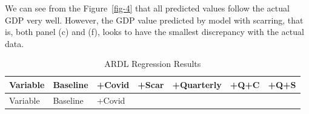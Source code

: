 \documentclass[
  manuscript=article,
  layout=publish,
  year=2026,
  volume=3,
]{den}
\begin{document}
We can see from the Figure~\ref{fig-4} that all predicted values follow
the actual GDP very well. However, the GDP value predicted by model with
scarring, that is, both panel (c) and (f), looks to have the smallest
discrepancy with the actual data.

\begin{longtable}[]{@{}
  >{\raggedright\arraybackslash}p{}
  >{\raggedright\arraybackslash}p{}
  >{\raggedright\arraybackslash}p{}
  >{\raggedright\arraybackslash}p{}
  >{\raggedright\arraybackslash}p{}
  >{\raggedright\arraybackslash}p{}
  >{\raggedright\arraybackslash}p{}@{}}
\caption{ARDL Regression Results}\label{tbl-ardl}\tabularnewline
\toprule\noalign{}
\begin{minipage}[b]{\linewidth}\raggedright
Variable
\end{minipage} & \begin{minipage}[b]{\linewidth}\raggedright
Baseline
\end{minipage} & \begin{minipage}[b]{\linewidth}\raggedright
+Covid
\end{minipage} & \begin{minipage}[b]{\linewidth}\raggedright
+Scar
\end{minipage} & \begin{minipage}[b]{\linewidth}\raggedright
+Quarterly
\end{minipage} & \begin{minipage}[b]{\linewidth}\raggedright
+Q+C
\end{minipage} & \begin{minipage}[b]{\linewidth}\raggedright
+Q+S
\end{minipage} \\
\midrule\noalign{}
\endfirsthead
\toprule\noalign{}
\begin{minipage}[b]{\linewidth}\raggedright
Variable
\end{minipage} & \begin{minipage}[b]{\linewidth}\raggedright
Baseline
\end{minipage} & \begin{minipage}[b]{\linewidth}\raggedright
+Covid
\end{minipage} & \begin{minipage}[b]{\linewidth}\raggedright

\end{minipage}
\end{longtable}
\end{document}
